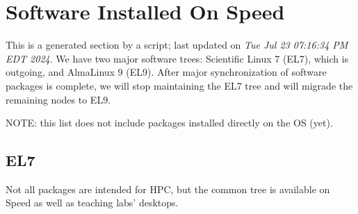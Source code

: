\section{Software Installed On Speed}
\label{sect:software-details}

This is a generated section by a script; last updated on \textit{Tue Jul 23 07:16:34 PM EDT 2024}.
We have two major software trees: Scientific Linux 7 (EL7), which is
outgoing, and AlmaLinux 9 (EL9). After major synchronization of software
packages is complete, we will stop maintaining the EL7 tree and
will migrade the remaining nodes to EL9.

NOTE: this list does not include packages installed directly on the OS (yet).

\subsection{EL7}
\label{sect:software-el7}

Not all packages are intended for HPC, but the common tree is available
on Speed as well as teaching labs' desktops.

